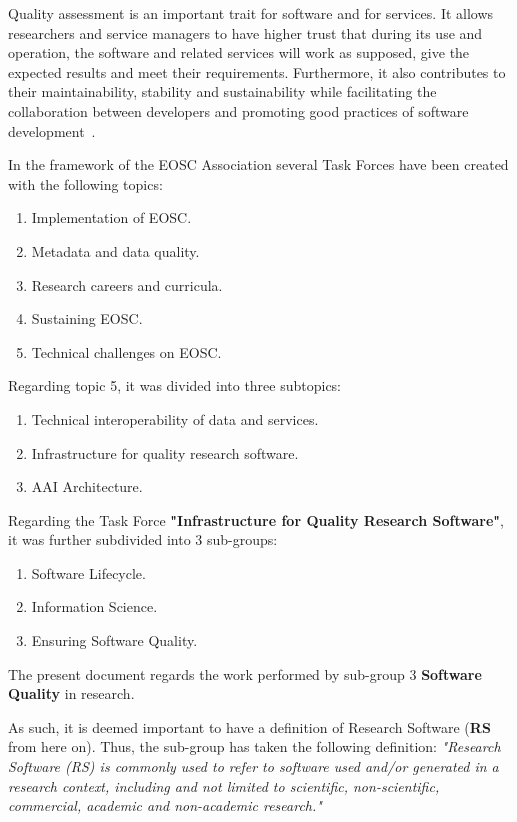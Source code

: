 Quality assessment is an important trait for software and for services. It allows researchers and service managers to have higher trust that during its use and operation, the software and related services will work as supposed, give the expected results and meet their requirements. Furthermore, it also contributes to their maintainability, stability and sustainability while facilitating the collaboration between developers and promoting good practices of software development~\cite{eosc_synergyD31}.

In the framework of the EOSC Association several Task Forces have been created with the following topics:

\begin{enumerate}
    \item Implementation of EOSC.
    \item Metadata and data quality.
    \item Research careers and curricula.
    \item Sustaining EOSC.
    \item Technical challenges on EOSC.
\end{enumerate}

Regarding topic 5, it was divided into three subtopics:

\begin{enumerate}
    \item Technical interoperability of data and services.
    \item Infrastructure for quality research software.
    \item AAI Architecture.
\end{enumerate}

Regarding the Task Force \textbf{"Infrastructure for Quality Research Software"}, it was further subdivided into 3 sub-groups:

\begin{enumerate}
    \item Software Lifecycle.
    \item Information Science.
    \item Ensuring Software Quality.
\end{enumerate}

The present document regards the work performed by sub-group 3 \textbf{Software Quality} in research.

As such, it is deemed important to have a definition of Research Software (\textbf{RS} from here on). Thus, the sub-group has taken the following definition: \textit{"Research Software (RS) is commonly used to refer to software used and/or generated in a research context, including and not limited to scientific, non-scientific, commercial, academic and non-academic research."}~\cite{gruenpeter_defining_2021}

